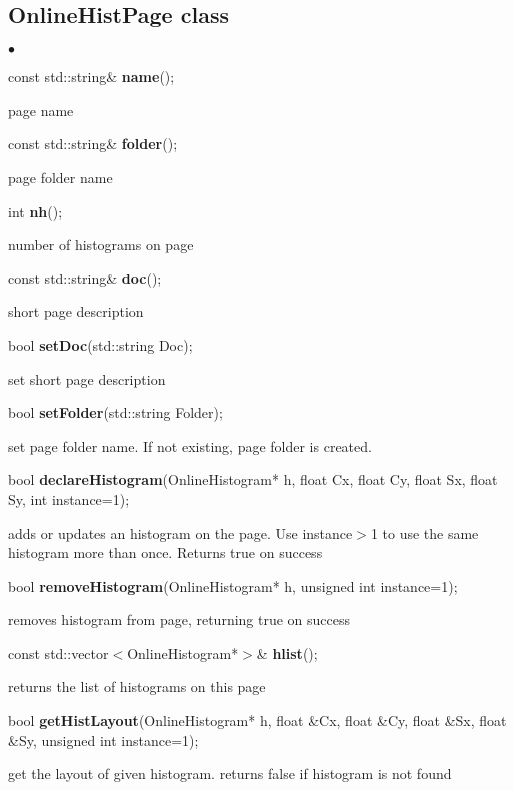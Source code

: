 \documentclass{lhcbnote}
\begin{document}
\subsection{OnlineHistPage class}

\begin{list}{$\bullet$}{}
\item   const std::string\& {\bf name}();

page name
\item   const std::string\& {\bf folder}();

page folder name
\item   int {\bf nh}();

number of histograms on page
\item   const std::string\& {\bf doc}();

short page description
\item bool {\bf setDoc}(std::string Doc);

set short page description
\item  bool {\bf setFolder}(std::string Folder);

set page folder name. If not existing, page folder is created.
\item   bool {\bf declareHistogram}(OnlineHistogram* h,
		    float Cx,
		    float Cy,
		    float Sx,
		    float Sy,
		    int instance=1);

adds or updates an histogram on the page. Use instance$>$1 to use the
same histogram more than once. Returns true on success

\item   bool {\bf removeHistogram}(OnlineHistogram* h, unsigned int instance=1);

removes histogram from page, returning true on success
\item   const std::vector$<$OnlineHistogram*$>$\& { \bf hlist}();

returns the list of histograms on this page
\item   bool {\bf getHistLayout}(OnlineHistogram* h,
		     float \&Cx,
		     float \&Cy,
		     float \&Sx,
		     float \&Sy,
		     unsigned int instance=1);

get the layout of given histogram. returns false if histogram is not found

\end{list}
\end{document}
